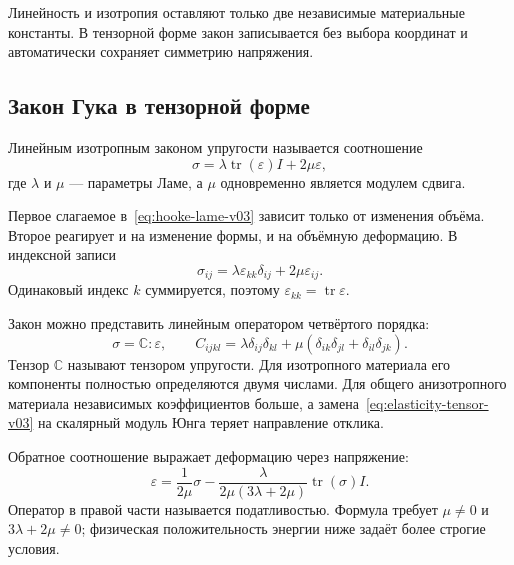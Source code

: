 Линейность и изотропия оставляют только две независимые материальные константы. В тензорной форме закон записывается без выбора координат и автоматически сохраняет симметрию напряжения.

\subsection{Закон Гука в тензорной форме}

\begin{definition}
Линейным изотропным законом упругости называется соотношение
\begin{equation}
\label{eq:hooke-lame-v03}
 \sigma
 =\lambda\operatorname{tr}(\varepsilon)I+2\mu\varepsilon,
\end{equation}
где $\lambda$ и $\mu$ --- параметры Ламе, а $\mu$ одновременно является модулем сдвига.
\end{definition}

Первое слагаемое в~\eqref{eq:hooke-lame-v03} зависит только от изменения объёма. Второе реагирует и на изменение формы, и на объёмную деформацию. В индексной записи
\begin{equation}
\label{eq:hooke-index-v03}
 \sigma_{ij}
 =\lambda\varepsilon_{kk}\delta_{ij}+2\mu\varepsilon_{ij}.
\end{equation}
Одинаковый индекс $k$ суммируется, поэтому $\varepsilon_{kk}=\operatorname{tr}\varepsilon$.

Закон можно представить линейным оператором четвёртого порядка:
\begin{equation}
\label{eq:elasticity-tensor-v03}
 \sigma=\mathbb{C}:\varepsilon,
 \qquad
 C_{ijkl}
 =\lambda\delta_{ij}\delta_{kl}
 +\mu(\delta_{ik}\delta_{jl}+\delta_{il}\delta_{jk}).
\end{equation}
Тензор $\mathbb{C}$ называют тензором упругости. Для изотропного материала его компоненты полностью определяются двумя числами. Для общего анизотропного материала независимых коэффициентов больше, а замена~\eqref{eq:elasticity-tensor-v03} на скалярный модуль Юнга теряет направление отклика.

Обратное соотношение выражает деформацию через напряжение:
\begin{equation}
\label{eq:compliance-lame-v03}
 \varepsilon
 =\frac{1}{2\mu}\sigma
 -\frac{\lambda}{2\mu(3\lambda+2\mu)}
  \operatorname{tr}(\sigma)I.
\end{equation}
Оператор в правой части называется податливостью. Формула требует $\mu\neq0$ и $3\lambda+2\mu\neq0$; физическая положительность энергии ниже задаёт более строгие условия.

